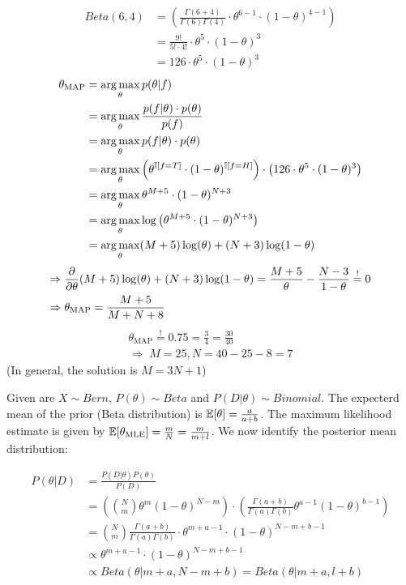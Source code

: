 %
%
%
%
%
\begin{align*}
  Beta(6,4) &= \left(\frac{\Gamma(6+4)}{\Gamma(6)\Gamma(4)} \cdot \theta^{6-1} \cdot (1-\theta)^{4-1}\right) \\
  &= \frac{9!}{5! \cdot 4!} \cdot \theta^5\cdot  (1-\theta)^3 \\
  &= 126 \cdot \theta^5 \cdot (1-\theta)^3
\end{align*}
\begin{align*}
  \theta_{\text{MAP}} &= \operatorname*{arg\,max}_\theta p(\theta|f) \\
  &= \operatorname*{arg\,max}_\theta \frac{p(f|\theta) \cdot p(\theta)}{p(f)} \\
  &= \operatorname*{arg\,max}_\theta p(f|\theta) \cdot p(\theta) \\
  &= \operatorname*{arg\,max}_\theta \left(\theta^{\mathbb{I}[f=T]} \cdot (1-\theta)^{\mathbb{I}[f=H]}\right) \cdot \left(126 \cdot \theta^5 \cdot (1-\theta)^3\right) \\
  &= \operatorname*{arg\,max}_\theta \theta^{M+5} \cdot (1-\theta)^{N+3} \\
  &= \operatorname*{arg\,max}_\theta \log\left(\theta^{M+5} \cdot (1-\theta)^{N+3}\right) \\ 
  &= \operatorname*{arg\,max}_\theta (M+5) \log(\theta) + (N+3) \log(1-\theta)
\end{align*}
\begin{align*}
  \Rightarrow \; & \frac{\partial}{\partial \theta} (M+5) \log(\theta) + (N+3) \log(1-\theta) = \frac{M+5}{\theta} - \frac{N-3}{1-\theta} \overset{!}{=} 0 \\
  \Rightarrow \; & \theta_\text{MAP} = \frac{M+5}{M+N+8}
\end{align*}
\begin{align*}
  \theta_\text{MAP} \overset{!}{=} 0.75 = \frac{3}{4} = \frac{30}{40} \\
  \Rightarrow \; M=25, N=40-25-8= 7
\end{align*}
(In general, the solution is $M=3N+1$)
%
%
\newpage
{}
%
\begin{flushleft}
Given are $X \sim Bern$, $P(\theta) \sim Beta$ and $P(D|\theta) \sim Binomial$.
The expecterd mean of the prior (Beta distribution) is $\mathbb{E}[\theta] = \frac{a}{a+b}$. The maximum likelihood estimate is given by $\mathbb{E}[\theta_\text{MLE}] = \frac{m}{N} = \frac{m}{m+l}$. We now identify the posterior mean distribution:
\end{flushleft}
\begin{align*}
P(\theta|D) &= \frac{P(D|\theta) P(\theta)}{P(D)} \\
&= \left(\binom{N}{m} \theta^m (1-\theta)^{N-m}\right) \cdot \left(\frac{\Gamma(a+b)}{\Gamma(a)\Gamma(b)} \theta^{a-1} (1-\theta)^{b-1}\right) \\
&= \binom{N}{m} \frac{\Gamma(a+b)}{\Gamma(a)\Gamma(b)} \cdot \theta^{m+a-1} \cdot (1-\theta)^{N-m+b-1} \\
&\propto \theta^{m+a-1} \cdot (1-\theta)^{N-m+b-1} \\
&\propto Beta(\theta | m+a, N-m+b) = Beta(\theta | m+a, l+b)
\end{align*}
